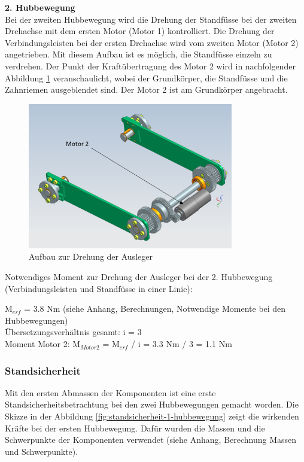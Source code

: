 \textbf{2. Hubbewegung}\\
Bei der zweiten Hubbewegung wird die Drehung der Standfüsse bei der zweiten Drehachse mit dem ersten Motor (Motor 1) kontrolliert. Die Drehung der Verbindungsleisten bei der ersten Drehachse wird vom zweiten Motor (Motor 2) angetrieben. Mit diesem Aufbau ist es möglich, die Standfüsse einzeln zu verdrehen. Der Punkt der Kraftübertragung des Motor 2 wird in nachfolgender Abbildung \ref{fig:motor-2} veranschaulicht, wobei der Grundkörper, die Standfüsse und die Zahnriemen ausgeblendet sind. Der Motor 2 ist am Grundkörper angebracht.

\begin{figure}[H]
  \includegraphics[width=0.8\textwidth]{img/Treppensteigen/Motor 2 final.PNG}
  \centering
  \caption{Aufbau zur Drehung der Ausleger}
  \label{fig:motor-2}
\end{figure}

Notwendiges Moment zur Drehung der Ausleger bei der 2. Hubbewegung (Verbindungsleisten und Standfüsse in einer Linie):

M$_{erf}$ = 3.8 Nm (siehe Anhang, Berechnungen, Notwendige Momente bei den Hubbewegungen)\\

Übersetzungsverhältnis gesamt: i = 3\\

Moment Motor 2: M$_{Motor 2}$ = M$_{erf}$ / i = 3.3 Nm / 3 = 1.1 Nm


\subsubsection{Standsicherheit}
Mit den ersten Abmassen der Komponenten ist eine erste Standsicherheitsbetrachtung bei den zwei Hubbewegungen gemacht worden. Die Skizze in der Abbildung \ref{fig:standsicherheit-1-hubbewegung} zeigt die wirkenden Kräfte bei der ersten Hubbewegung. Dafür wurden die Massen und die Schwerpunkte der Komponenten verwendet (siehe Anhang, Berechnung Massen und Schwerpunkte).\\

